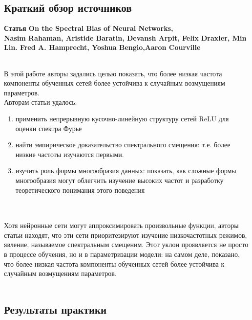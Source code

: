 \documentclass{article}
\begin{document}
    \newpage
    \begin{center} 
    \section{Краткий обзор источников}
    \large \textbf {Статья On the Spectral Bias of Neural Networks, \\ Nasim Rahaman, Aristide Baratin, Devansh Arpit, Felix Draxler, Min Lin. Fred A. Hamprecht, Yoshua Bengio,Aaron Courville}    
    \end{center}
    \\
    \large 
    В этой работе авторы задались целью показать, что более низкая частота компоненты обученных сетей более устойчива к случайным возмущениям параметров. 
    \\
    Авторам статьи удалось:
    \begin{enumerate}
    \item применить непрерывную кусочно-линейную структуру сетей ReLU для оценки спектра Фурье
    \item найти эмпирическое доказательство спектрального смещения: т.е. более низкие частоты изучаются первыми. 
    \item изучить роль формы многообразия данных: показать, как сложные формы многообразия могут облегчить изучение высоких частот и разработку теоретического понимания этого поведения
    \end{enumerate}
    \\ \\
    Хотя нейронные сети могут аппроксимировать произвольные функции, авторы статьи находят, что эти сети приоритезируют изучение низкочастотных режимов, явление, называемое спектральным смещеним. Этот уклон проявляется не просто в процессе обучения, но и в параметризации модели: на самом деле, показано, что более низкая частота компоненты обученных сетей более устойчива к случайным возмущениям параметров.
    \\
    
    \\
    \newpage
    \begin{center} 
    \section{Результаты практики}
    \end{center}
    \large
    
\end{document}
